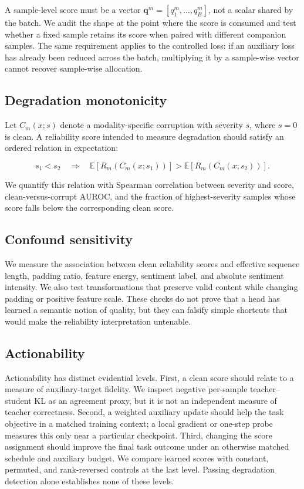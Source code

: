 A sample-level score must be a vector
\(\mathbf q^m=[q_1^m,\ldots,q_B^m]\), not a scalar shared by the batch.
We audit the shape at the point where the score is consumed and test
whether a fixed sample retains its score when paired with different
companion samples. The same requirement applies to the controlled loss:
if an auxiliary loss has already been reduced across the batch,
multiplying it by a sample-wise vector cannot recover sample-wise
allocation.

\subsection{Degradation
monotonicity}\label{degradation-monotonicity}

Let \(C_m(x;s)\) denote a modality-specific corruption with severity
\(s\), where \(s=0\) is clean. A reliability score intended to measure
degradation should satisfy an ordered relation in expectation:

\[
s_1<s_2 \quad\Rightarrow\quad
\mathbb E[R_m(C_m(x;s_1))] > \mathbb E[R_m(C_m(x;s_2))].
\]

We quantify this relation with Spearman correlation between severity and
score, clean-versus-corrupt AUROC, and the fraction of highest-severity
samples whose score falls below the corresponding clean score.

\subsection{Confound sensitivity}\label{confound-sensitivity}

We measure the association between clean reliability scores and
effective sequence length, padding ratio, feature energy, sentiment
label, and absolute sentiment intensity. We also test transformations
that preserve valid content while changing padding or positive feature
scale. These checks do not prove that a head has learned a semantic
notion of quality, but they can falsify simple shortcuts that would make
the reliability interpretation untenable.

\subsection{Actionability}\label{actionability}

Actionability has distinct evidential levels. First, a clean score should
relate to a measure of auxiliary-target fidelity. We inspect negative
per-sample teacher--student KL as an agreement proxy, but it is not an
independent measure of teacher correctness. Second, a weighted auxiliary update
should help the task objective in a matched training context; a local
gradient or one-step probe measures this only near a particular checkpoint.
Third, changing the score assignment should improve the final task outcome
under an otherwise matched schedule and auxiliary budget. We compare learned
scores with constant, permuted, and rank-reversed controls at the last level.
Passing degradation detection alone establishes none of these levels.

